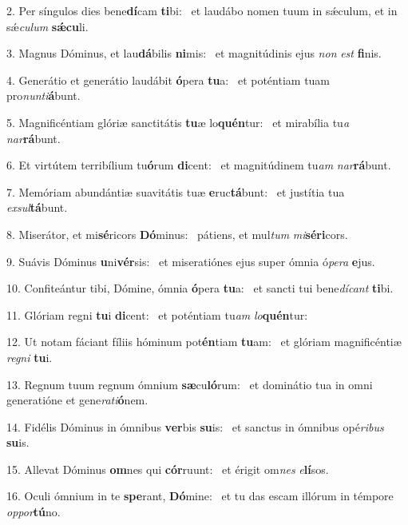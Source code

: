 2. Per síngulos dies bene\textbf{dí}cam \textbf{ti}bi: \ast\  et laudábo nomen tuum in sǽculum, et in sǽ\textit{cu}\textit{lum} \textbf{sǽ}\textbf{cu}li.\

3. Magnus Dóminus, et lau\textbf{dá}bilis \textbf{ni}mis: \ast\  et magnitúdinis ejus \textit{non} \textit{est} \textbf{fi}nis.\

4. Generátio et generátio laudábit \textbf{ó}pera \textbf{tu}a: \ast\  et poténtiam tuam pro\textit{nun}\textit{ti}\textbf{á}bunt.\

5. Magnificéntiam glóriæ sanctitátis \textbf{tu}æ lo\textbf{quén}tur: \ast\  et mirabília tu\textit{a} \textit{nar}\textbf{rá}bunt.\

6. Et virtútem terribílium tu\textbf{ó}rum \textbf{di}cent: \ast\  et magnitúdinem tu\textit{am} \textit{nar}\textbf{rá}bunt.\

7. Memóriam abundántiæ suavitátis tuæ \textbf{e}ruc\textbf{tá}bunt: \ast\  et justítia tua \textit{ex}\textit{sul}\textbf{tá}bunt.\

8. Miserátor, et mi\textbf{sé}ricors \textbf{Dó}minus: \ast\  pátiens, et mul\textit{tum} \textit{mi}\textbf{sé}\textbf{ri}cors.\

9. Suávis Dóminus \textbf{u}ni\textbf{vér}sis: \ast\  et miseratiónes ejus super ómnia ó\textit{pe}\textit{ra} \textbf{e}jus.\

10. Confiteántur tibi, Dómine, ómnia \textbf{ó}pera \textbf{tu}a: \ast\  et sancti tui bene\textit{dí}\textit{cant} \textbf{ti}bi.\

11. Glóriam regni \textbf{tu}i \textbf{di}cent: \ast\  et poténtiam tu\textit{am} \textit{lo}\textbf{quén}tur:\

12. Ut notam fáciant fíliis hóminum pot\textbf{én}tiam \textbf{tu}am: \ast\  et glóriam magnificéntiæ \textit{re}\textit{gni} \textbf{tu}i.\

13. Regnum tuum regnum ómnium \textbf{sæ}cu\textbf{ló}rum: \ast\  et dominátio tua in omni generatióne et gene\textit{ra}\textit{ti}\textbf{ó}nem.\

14. Fidélis Dóminus in ómnibus \textbf{ver}bis \textbf{su}is: \ast\  et sanctus in ómnibus opé\textit{ri}\textit{bus} \textbf{su}is.\

15. Allevat Dóminus \textbf{om}nes qui \textbf{cór}ruunt: \ast\  et érigit om\textit{nes} \textit{e}\textbf{lí}sos.\

16. Oculi ómnium in te \textbf{spe}rant, \textbf{Dó}mine: \ast\  et tu das escam illórum in témpore \textit{op}\textit{por}\textbf{tú}no.\

